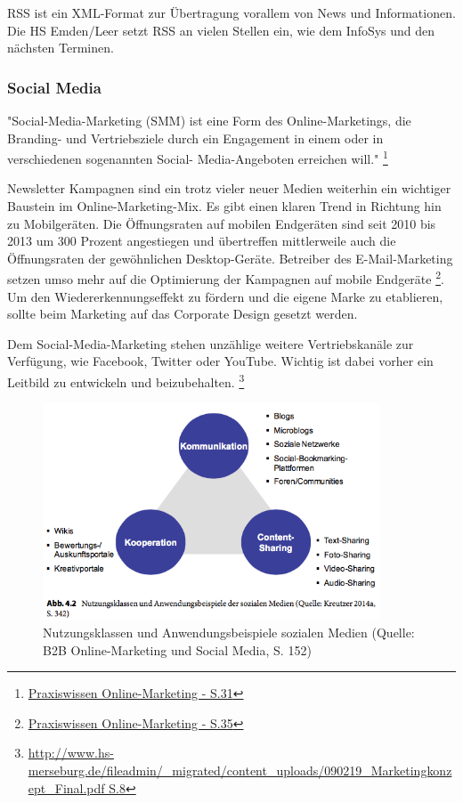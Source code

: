 RSS ist ein XML-Format zur Übertragung vorallem von News und Informationen. Die HS Emden/Leer setzt RSS an vielen Stellen ein, wie dem InfoSys und den nächsten Terminen.

\subsubsection{Social Media}
"Social-Media-Marketing (SMM) ist eine Form des Online-Marketings, die Branding- und Vertriebsziele durch ein Engagement in einem oder in verschiedenen sogenannten Social- Media-Angeboten erreichen will." \footnote{\url{Praxiswissen Online-Marketing - S.31}}

Newsletter Kampagnen sind ein trotz vieler neuer Medien weiterhin ein wichtiger Baustein im Online-Marketing-Mix. Es gibt einen klaren Trend in Richtung hin zu Mobilgeräten. Die Öffnungsraten auf mobilen Endgeräten sind seit 2010 bis 2013 um 300 Prozent angestiegen und übertreffen mittlerweile auch die Öffnungsraten der gewöhnlichen Desktop-Geräte. Betreiber des E-Mail-Marketing setzen umso mehr auf die Optimierung der Kampagnen auf mobile Endgeräte \footnote{\url{Praxiswissen Online-Marketing - S.35}}. Um den Wiedererkennungseffekt zu fördern und die eigene Marke zu etablieren, sollte beim Marketing auf das Corporate Design gesetzt werden.

Dem Social-Media-Marketing stehen unzählige weitere Vertriebskanäle zur Verfügung, wie Facebook, Twitter oder YouTube. Wichtig ist dabei vorher ein Leitbild zu entwickeln und beizubehalten. \footnote{\url{http://www.hs-merseburg.de/fileadmin/_migrated/content_uploads/090219_Marketingkonzept_Final.pdf S.8}}

\begin{figure}[h!]
	\centering
	\includegraphics[width=10cm]{kapitel/gruppe1_2/bilder/nutzungsklassen}
	\caption{Nutzungsklassen und Anwendungsbeispiele sozialen Medien (Quelle: B2B Online-Marketing und Social Media, S. 152)}
	\label{fig_nutzungsklassen}
\end{figure}

